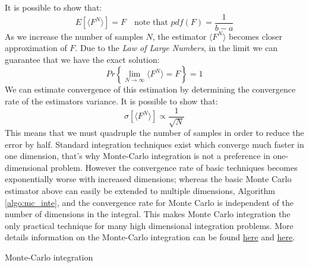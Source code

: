It is possible to show that:
\begin{equation}
	E \left[ \langle F^N \rangle \right] = F \quad \text{note that } pdf(F) = \frac{1}{b-a}
\end{equation}
As we increase the number of samples $N$, the estimator $\langle F^N \rangle$ becomes closer approximation of $F$. Due to the \textit{Law of Large Numbers}, in the limit we can guarantee that we have the exact solution:
\begin{equation}
	Pr \left\{ \lim_{N \rightarrow \infty} \langle F^N \rangle = F \right\} = 1
\end{equation}
We can estimate convergence of this estimation by determining the convergence rate of the estimators variance. It is possible to show that:
\begin{equation}
	\sigma \left[ \langle F^N \rangle \right] \propto \frac{1}{\sqrt{N}}
\end{equation}
This means that we must quadruple the number of samples in order to reduce the error by half. Standard integration techniques exist which converge much faster in one dimension, that's why Monte-Carlo integration is not a preference in one-dimensional problem. However the convergence rate of basic techniques becomes exponentially worse with increased dimensions; whereas the basic Monte Carlo estimator above can easily be extended to multiple dimensions, Algorithm \ref{algo:mc_inte}, and the convergence rate for Monte Carlo is independent of the number of dimensions in the integral. This makes Monte Carlo integration the only practical technique for many high dimensional integration problems. More details information on the Monte-Carlo integration can be found \href{https://cs.dartmouth.edu/~wjarosz/publications/dissertation/appendixA.pdf}{here} and \href{https://en.wikipedia.org/wiki/Monte_Carlo_integration}{here}.

\vspace{\baselineskip}
\begin{algorithm}[H]
\caption{Monte-Carlo integration}
\label{algo:mc_inte}  
\end{algorithm}
\vspace{\baselineskip}

